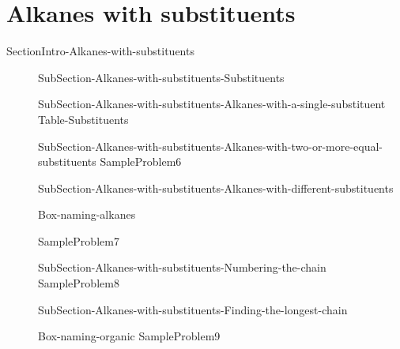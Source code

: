 \documentclass[main.tex]{subfiles}
\begin{document}
 
\section{Alkanes with substituents}{SectionIntro-Alkanes-with-substituents}
\sloppy\begin{description}
\item[]{SubSection-Alkanes-with-substituents-Substituents}
\item[]{SubSection-Alkanes-with-substituents-Alkanes-with-a-single-substituent}
\hspace{-3cm}
{Table-Substituents}
\item[]{SubSection-Alkanes-with-substituents-Alkanes-with-two-or-more-equal-substituents}
{SampleProblem6}
\item[]{SubSection-Alkanes-with-substituents-Alkanes-with-different-substituents}
\item[]{Box-naming-alkanes}

{SampleProblem7}
\item[]{SubSection-Alkanes-with-substituents-Numbering-the-chain}
{SampleProblem8}
\item[]{SubSection-Alkanes-with-substituents-Finding-the-longest-chain}
\item[]{Box-naming-organic} 
{SampleProblem9}
\end{description}
\end{document}
